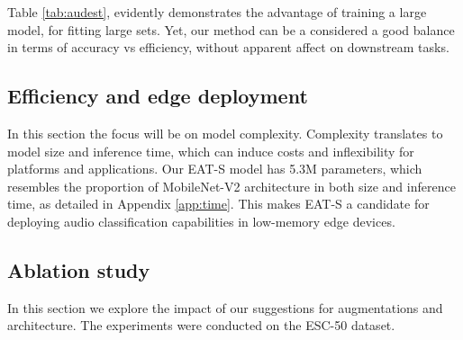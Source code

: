 \noindent Table \ref{tab:audest}, evidently demonstrates the advantage of training a large model, for fitting large sets. Yet, our method can be a considered a good balance in terms of accuracy vs efficiency, without apparent affect on downstream tasks.
\subsection{Efficiency and edge deployment}
In this section the focus will be on model complexity. Complexity translates to model size and inference time, which can induce costs and inflexibility for platforms and applications. Our EAT-S model has 5.3M parameters, which resembles the proportion of MobileNet-V2 architecture \cite{sandler2018mobilenetv2} in both size and inference time, as detailed in Appendix \ref{app:time}. This makes EAT-S a candidate for deploying audio classification capabilities in low-memory edge devices.

\subsection{Ablation study}
In this section we explore the impact of our suggestions for augmentations and architecture. The experiments were conducted on the ESC-50 dataset.

\begin{table}[htbp]
\caption{Ablations - Classification results conducted on ESC-50 (incremental improvements over baselines)}
\label{tab:ablations}
\centering
{}\qquad\qquad {}
\end{table}

